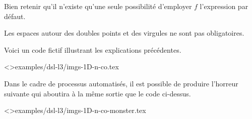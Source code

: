 \documentclass{tutodoc}
\begin{document}
\begin{tdocwarn}
    Bien retenir qu'il n'existe qu'une seule possibilité d'employer $f$ l'expression par défaut.
\end{tdocwarn}




\begin{tdocnote}
    Les espaces autour des doubles points et des virgules ne sont pas obligatoires.
\end{tdocnote}




Voici un code fictif illustrant les explications précédentes.

\tdoclatexinput<>{examples/dsl-l3/imgs-1D-n-co.tex}


Dans le cadre de processus automatisés, il est possible de produire l'horreur suivante qui aboutira à la même sortie que le code ci-dessus.

\tdoclatexinput<>{examples/dsl-l3/imgs-1D-n-co-monster.tex}
\end{document}
